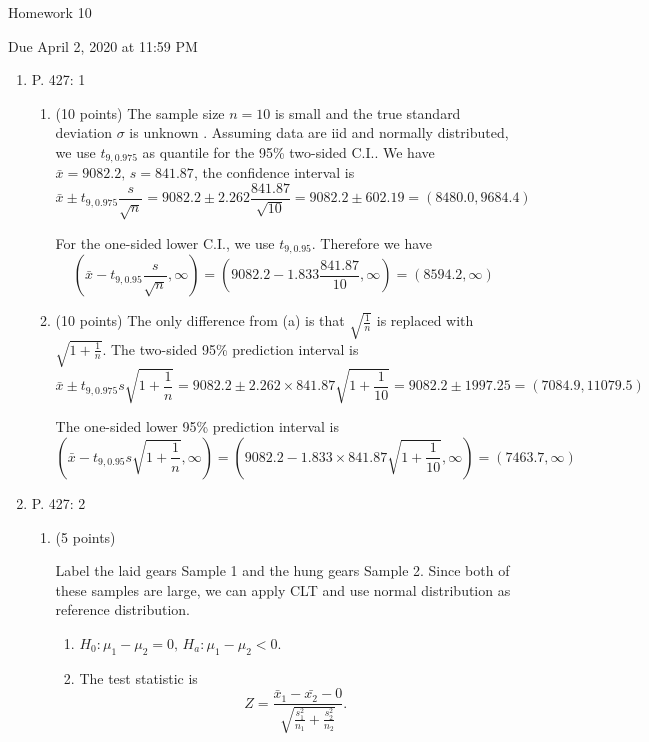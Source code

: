 \documentclass{article}\usepackage[]{graphicx}\usepackage[]{color}
\begin{document}
\begin{center} 
\LARGE
Homework 10
\end{center}
\begin{center} 
\Large
Due April 2, 2020 at 11:59 PM 
\end{center}



\begin{enumerate}

	\item P. 427: 1
	\begin{enumerate}
	\item (10 points)
	The sample size $n = 10$ is small and the true standard deviation $\sigma$ is unknown . Assuming data are iid and normally distributed, we use $t_{9, 0.975}$ as quantile for the 95\% two-sided C.I.. We have $\bar{x} = 9082.2,\, s = 841.87$, the confidence interval is
	\[\bar{x} \pm t_{9, 0.975} \frac{s}{\sqrt{n}} = 9082.2 \pm 2.262 \frac{841.87}{\sqrt{10}} = 9082.2 \pm 602.19 = (8480.0, 9684.4)\]

	For the one-sided lower C.I., we use $t_{9, 0.95}$. Therefore we have
	\[\left(\bar{x} - t_{9, 0.95} \frac{s}{\sqrt{n}}, \infty\right) = \left(9082.2 - 1.833 \frac{841.87}{10}, \infty\right) = (8594.2, \infty)\]

	\item (10 points)
	The only difference from (a) is that $\sqrt{\frac{1}{n}}$ is replaced with $\sqrt{1 + \frac{1}{n}}$. The two-sided 95\% prediction interval is
	\[\bar{x} \pm t_{9, 0.975} s \sqrt{1 + \frac{1}{n}} = 9082.2 \pm 2.262 \times 841.87 \sqrt{1 + \frac{1}{10}} = 9082.2 \pm 1997.25 = (7084.9, 11079.5)\]
	
	The one-sided lower 95\% prediction interval is
	\[\left(\bar{x} - t_{9, 0.95} s \sqrt{1 + \frac{1}{{n}}}, \infty\right) = \left(9082.2 - 1.833 \times 841.87\sqrt{1 + \frac{1}{10}}, \infty\right) = (7463.7, \infty)\]

	\end{enumerate}
	\item P. 427: 2
	\begin{enumerate}
	\item (5 points)
	
	Label the laid gears Sample 1 and the hung gears Sample 2. Since both of these samples are large, we can apply CLT and use normal distribution as reference distribution.
	
	\begin{enumerate}[label=\arabic*.]
	\item $H_0: \mu_1 - \mu_2 = 0,\, H_a: \mu_1 - \mu_2 < 0.$
	\item The test statistic is
	\[Z = \frac{\bar{x}_1 - \bar{x_2} - 0}{\sqrt{\frac{s_1^2}{n_1} + \frac{s_2^2}{n_2}}}.\]


\end{enumerate}
\end{enumerate}
\end{enumerate}
\end{document}
